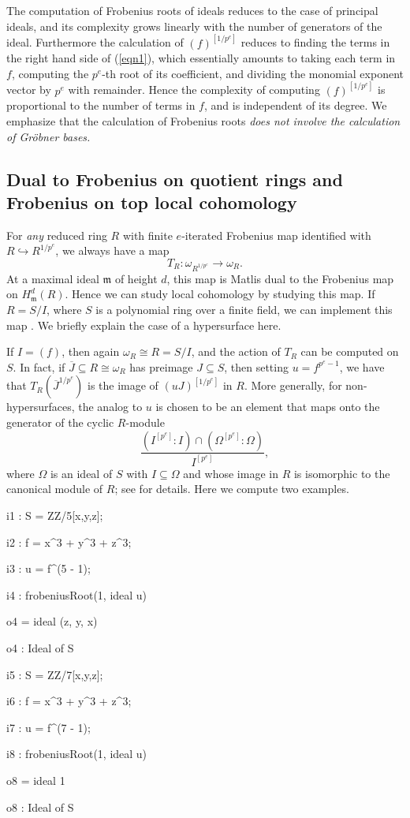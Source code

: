 \documentclass{amsart}
\newcommand{\fram}{\mathfrak{m}}
\begin{document}
The computation of Frobenius roots of ideals reduces to the case of principal ideals, and its complexity grows linearly with the number of generators of the ideal.
Furthermore the calculation of  $(f)^{[1/p^e]}$ reduces to finding the terms in the right hand side of (\ref{eqn1}), which essentially amounts to
taking each term in $f$, computing the $p^e$-th root of its coefficient, and dividing the monomial exponent vector by $p^e$ with remainder.
Hence the complexity of computing $(f)^{[1/p^e]}$ is proportional to the number of terms in $f$, and is independent of its degree.
We emphasize that the calculation of Frobenius roots \emph{does not involve the calculation of Gr\"obner bases.}

\subsection{Dual to Frobenius on quotient rings and Frobenius on top local cohomology}
\label{subsec.DualToFrobeniusOnQuotientRings}
For \emph{any} reduced ring $R$ with finite $e$-iterated Frobenius map identified with $R \hookrightarrow R^{1/p^e}$, we always have a map
\[
T_R : \omega_{R^{1/p^e}} \to \omega_R.
\]
At a maximal ideal $\fram$ of height $d$, this map is Matlis dual to the Frobenius map on $H^d_{\fram}(R)$.
Hence we can study local cohomology by studying this map.
If $R = S/I$, where $S$ is a polynomial ring over a finite field, we can implement this map \cite{FedderFPureRat, KatzmanParameterTestIdealOfCMRings}.  We briefly explain the case of a hypersurface here.

If $I = (f)$, then again $\omega_R \cong R = S/I$, and the action of $T_R$ can be computed on $S$.  In fact, if $\overline{J} \subseteq R \cong \omega_R$ has preimage  $J \subseteq S$,
then setting $u = f^{p^e-1}$, we have that $T_R({\overline J}^{1/p^e})$ is the image of $(u J)^{[1/p^e]}$ in $R$.
More generally, for non-hypersurfaces, the analog to $u$ is chosen to be an element that maps onto the generator of the cyclic $R$-module
\[
\frac{(I^{[p^e]} : I) \cap (\Omega^{[p^e]} : \Omega)}{ I^{[p^e]}},
\]
where $\Omega$ is an ideal of $S$ with $I\subseteq \Omega$ and whose image in $R$ is isomorphic to the canonical module of $R$; see \cite{KatzmanParameterTestIdealOfCMRings} for details.
Here we compute two examples.

\medskip
{\small{}
\begin{MyVerbatim}
i1 : S = ZZ/5[x,y,z];

i2 : f = x^3 + y^3 + z^3;

i3 : u = f^(5 - 1);

i4 : frobeniusRoot(1, ideal u)

o4 = ideal (z, y, x)

o4 : Ideal of S

i5 : S = ZZ/7[x,y,z];

i6 : f = x^3 + y^3 + z^3;

i7 : u = f^(7 - 1);

i8 : frobeniusRoot(1, ideal u)

o8 = ideal 1

o8 : Ideal of S
\end{MyVerbatim}
}\medskip
\end{document}
